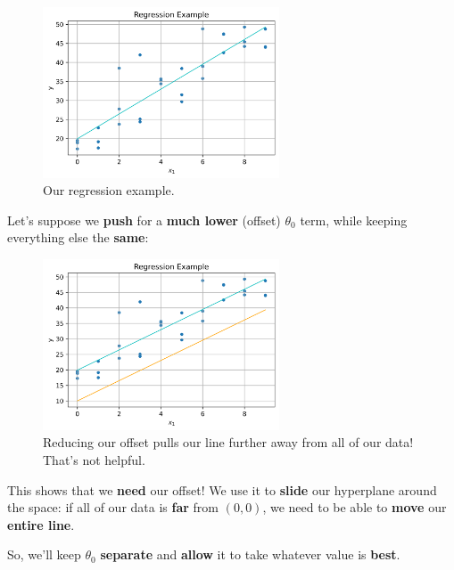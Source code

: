         \begin{figure}[H]
        \centering
            \includegraphics[width=70mm,scale=0.5]{images/regression_images/Regression_Keep_Offset.png}
        
            \caption*{Our regression example.}
        \end{figure}
        
        Let's suppose we \textbf{push} for a \textbf{much lower} (offset) $\theta_0$ term, while keeping everything else the \textbf{same}:
        
        \begin{figure}[H]
        \centering
            \includegraphics[width=70mm,scale=0.5]{images/regression_images/Regression_Remove_Offset.png}
        
            \caption*{Reducing our offset pulls our line further away from all of our data! That's not helpful.}
        \end{figure}
        
        This shows that we \textbf{need} our offset! We use it to \textbf{slide} our hyperplane around the space: if all of our data is \textbf{far} from $(0,0)$, we need to be able to \textbf{move} our \textbf{entire line}.
        
        So, we'll keep $\theta_0$ \textbf{separate} and \textbf{allow} it to take whatever value is \textbf{best}.\\
        
